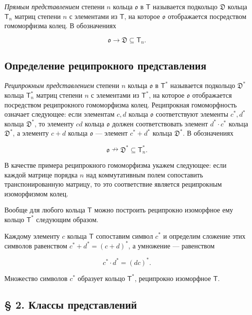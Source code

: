 \documentclass[11pt]{article}
\begin{document}
\emph{Прямым представлением} степени \(n\) кольца \(\mathfrak{o}\) в \(\mathsf T\) называется подкольцо \(\mathfrak D\) кольца \(\mathsf T_n\) матриц степени \(n\) с элементами из \(\mathsf T\), на которое \(\mathfrak{o}\) отображается посредством гомоморфизма колец. В обозначениях

\[
\mathfrak{o}\to\mathfrak D\subseteq\mathsf T_n.
\]

\subsection*{Определение реципрокного представления}\label{definition-der-reziproken-darstellung}

\emph{Реципрокным представлением} степени \(n\) кольца \(\mathfrak{o}\) в \(\mathsf T^*\) называется подкольцо \(\mathfrak D^*\) кольца \(\mathsf T_n^*\) матриц степени \(n\) с элементами из \(\mathsf T^*\), на которое \(\mathfrak{o}\) отображается посредством реципрокного гомоморфизма колец. Реципрокная гомоморфность означает следующее: если элементам \(c,d\) кольца \(\mathfrak{o}\) соответствуют элементы \(c^*,d^*\) кольца \(\mathfrak D^*\), то элементу \(cd\) кольца \(\mathfrak{o}\) должен соответствовать элемент \(d^*\cdot c^*\) кольца \(\mathfrak D^*\), а элементу \(c+d\) кольца \(\mathfrak{o}\) --- элемент \(c^*+d^*\) кольца \(\mathfrak D^*\). В обозначениях

\[
\mathfrak{o}\nrightarrow\mathfrak D^*\subseteq\mathsf T_n^*.
\]

В качестве примера реципрокного гомоморфизма укажем следующее: если каждой матрице порядка \(n\) над коммутативным полем сопоставить транспонированную матрицу, то это соответствие является реципрокным изоморфизмом колец.

Вообще для любого кольца \(\mathsf T\) можно построить реципрокно изоморфное ему кольцо \(\mathsf T^*\) следующим образом.

Каждому элементу \(c\) кольца \(\mathsf T\) сопоставим символ \(c^*\) и определим сложение этих символов равенством \(c^*+d^*=(c+d)^*\), а умножение --- равенством

\[
c^*\cdot d^*=(dc)^*.
\]

Множество символов \(c^*\) образует кольцо \(\mathsf T^*\), реципрокно изоморфное \(\mathsf T\).

\subsection*{§ 2. Классы представлений}\label{darstellungsklassen}
\end{document}
